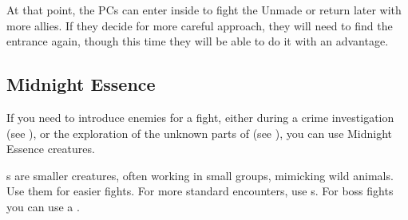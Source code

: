 At that point, the PCs can enter inside to fight the Unmade or return later with more allies. If they decide for more careful approach, they will need to find the entrance again, though this time they will be able to do it with an advantage.




\subsection{Midnight Essence}
\label{ssec:stoppingWrongnessMidnightEssence}

If you need to introduce enemies for a fight, either during a crime investigation (see ), or the exploration of the unknown parts of \locationUrithiru{} (see ), you can use Midnight Essence creatures.

\enemyMidnightBeast{}s are smaller creatures, often working in small groups, mimicking wild animals. Use them for easier fights. For more standard encounters, use \enemyMidnightAssassin{}s. For boss fights you can use a \enemyMidnightTwin{}.

